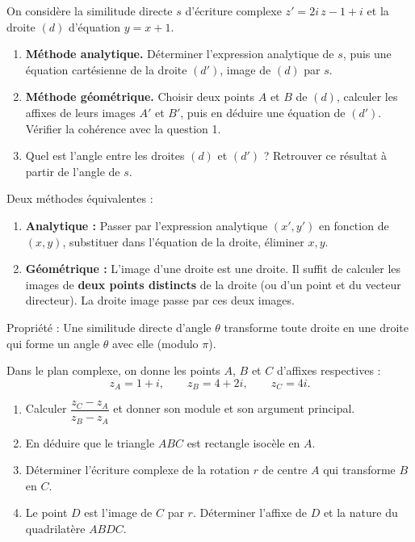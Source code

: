 \documentclass[11pt]{article}
\newcommand{\cle}[1]{{\popxbold\color{popdark}#1}}
\begin{document}
\begin{exercice}
On considère la similitude directe $s$ d'écriture complexe $z' = 2i\,z - 1 + i$ et la droite $(d)$ d'équation $y = x + 1$.
\begin{enumerate}
\item \textbf{Méthode analytique.} Déterminer l'expression analytique de $s$, puis une équation cartésienne de la droite $(d')$, image de $(d)$ par $s$.
\item \textbf{Méthode géométrique.} Choisir deux points $A$ et $B$ de $(d)$, calculer les affixes de leurs images $A'$ et $B'$, puis en déduire une équation de $(d')$. Vérifier la cohérence avec la question 1.
\item Quel est l'angle entre les droites $(d)$ et $(d')$ ? Retrouver ce résultat à partir de l'angle de $s$.
\end{enumerate}
\end{exercice}

\begin{methode}
Deux méthodes équivalentes :
\begin{enumerate}
\item \textbf{Analytique :} Passer par l'expression analytique $(x',y')$ en fonction de $(x,y)$, substituer dans l'équation de la droite, éliminer $x,y$.
\item \textbf{Géométrique :} L'image d'une droite est une droite. Il suffit de calculer les images de \textbf{deux points distincts} de la droite (ou d'un point et du vecteur directeur). La droite image passe par ces deux images.
\end{enumerate}
\cle{Propriété} : Une similitude directe d'angle $\theta$ transforme toute droite en une droite qui forme un angle $\theta$ avec elle (modulo $\pi$).
\end{methode}

\begin{exercice}
Dans le plan complexe, on donne les points $A$, $B$ et $C$ d'affixes respectives :
\[ z_A = 1 + i, \qquad z_B = 4 + 2i, \qquad z_C = 4i. \]
\begin{enumerate}
\item Calculer $\dfrac{z_C - z_A}{z_B - z_A}$ et donner son module et son argument principal.
\item En déduire que le triangle $ABC$ est rectangle isocèle en $A$.
\item Déterminer l'écriture complexe de la rotation $r$ de centre $A$ qui transforme $B$ en $C$.
\item Le point $D$ est l'image de $C$ par $r$. Déterminer l'affixe de $D$ et la nature du quadrilatère $ABDC$.
\end{enumerate}
\end{exercice}
\end{document}
